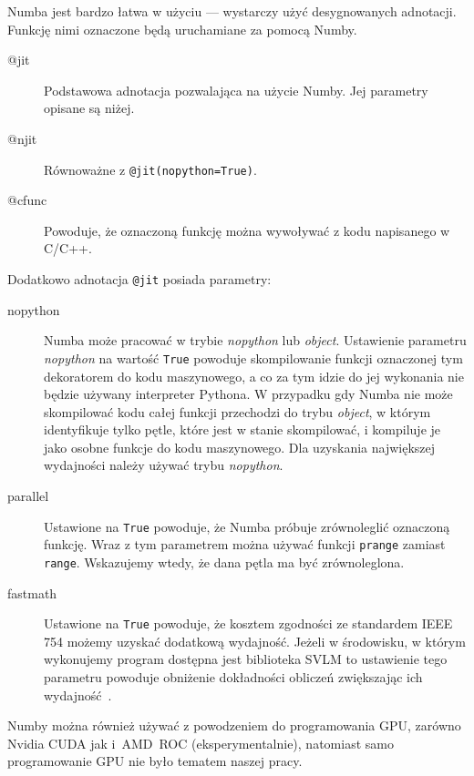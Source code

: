 Numba jest bardzo łatwa w użyciu --- wystarczy użyć desygnowanych
adnotacji.
Funkcję nimi oznaczone będą uruchamiane za pomocą Numby.
\begin{description}
    \item[@jit]
    Podstawowa adnotacja pozwalająca na użycie Numby.
    Jej parametry opisane są niżej.
    \item[@njit]
    Równoważne z \texttt{@jit(nopython=True)}.
    \item[@cfunc]
    Powoduje, że oznaczoną funkcję można wywoływać z kodu napisanego w C/C++.
\end{description}
Dodatkowo adnotacja \texttt{@jit} posiada parametry:
\begin{description}
    \item [nopython]
    Numba może pracować w trybie \textit{nopython} lub \textit{object}.
    Ustawienie parametru \textit{nopython} na wartość \texttt{True}
    powoduje skompilowanie
    funkcji oznaczonej tym dekoratorem do kodu maszynowego, a co za tym idzie
    do jej wykonania nie będzie używany interpreter Pythona.
    W przypadku gdy Numba nie może skompilować kodu całej funkcji
    przechodzi do trybu \textit{object}, w którym identyfikuje tylko pętle,
    które jest w stanie skompilować, i kompiluje je jako osobne funkcje
    do kodu maszynowego.
    Dla uzyskania największej wydajności należy używać trybu \textit{nopython}.
    \item [parallel]
    Ustawione na \texttt{True} powoduje, że Numba próbuje
    zrównoleglić oznaczoną funkcję.
    Wraz z tym parametrem można używać funkcji \texttt{prange}
    zamiast \texttt{range}.
    Wskazujemy wtedy, że dana pętla ma być zrównoleglona.
    \item [fastmath]
    Ustawione na \texttt{True} powoduje, że kosztem zgodności
    ze standardem IEEE 754 możemy uzyskać dodatkową wydajność.
    Jeżeli w środowisku, w którym wykonujemy program dostępna jest
    biblioteka SVLM to ustawienie tego parametru powoduje obniżenie
    dokładności obliczeń zwiększając ich wydajność~\cite{numba_fastmnath}.
\end{description}

Numby można również używać z powodzeniem do programowania GPU,
zarówno Nvidia CUDA jak i~AMD~ROC (eksperymentalnie),
natomiast samo programowanie GPU nie było tematem naszej pracy.
